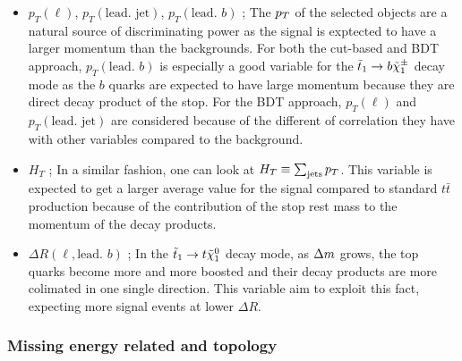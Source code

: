                 \begin{itemize}
                    \item $p_T(\ell)$, $p_T(\text{lead. jet})$, $p_T(\text{lead. } b)$ ; The $p_T$ of the 
                        selected objects are a natural source of discriminating power as the signal is exptected 
                        to have a larger momentum than the backgrounds. For both the cut-based and BDT approach, 
                        $p_T(\text{lead. } b)$ is especially a good variable for the $\tilde{t}_1 \rightarrow b \tilde{\chi}_1^\pm$ 
                        decay mode as the $b$ quarks are expected to have large momentum because they are direct 
                        decay product of the stop. For the BDT approach, $p_T(\ell)$ and $p_T(\text{lead. jet})$ 
                        are considered because of the different of correlation they have with other variables 
                        compared to the background.
                    \item $H_T$ ; In a similar fashion, one can look at $H_T \equiv \sum_{\text{jets}} p_T$. 
                        This variable is expected to get a larger average value for the signal compared to standard 
                        $t\bar{t}$ production because of the contribution of the stop rest mass to the momentum of 
                        the decay products.
                    \item $\Delta R( \ell, \text{lead. } b)$ ; In the $\tilde{t}_1 \rightarrow t \tilde{\chi}_1^0$ decay mode,
                        as $\Delta m$ grows, the top quarks become more and more boosted and their decay products are 
                        more colimated in one single direction. This variable aim to exploit this fact, expecting more 
                        signal events at lower $\Delta R$.
                \end{itemize}

           \subsubsection{Missing energy related and topology}

